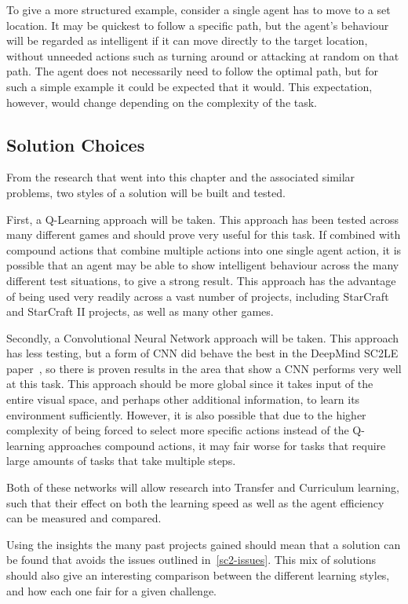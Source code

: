 To give a more structured example, consider a single agent has to move to
a set location. It may be quickest to follow a specific path, but the agent's
behaviour will be regarded as intelligent if it can move directly to the
target location, without unneeded actions such as turning around or attacking at
random on that path. The agent does not necessarily need to follow the optimal
path, but for such a simple example it could be expected that it would. This
expectation, however, would change depending on the complexity of the task.

\subsection{Solution Choices}

From the research that went into this chapter and the associated similar
problems, two styles of a solution will be built and tested.

First, a Q-Learning approach will be taken. This approach has been tested across
many different games and should prove very useful for this task. If combined
with compound actions that combine multiple actions into one single agent
action, it is possible that an agent may be able to show intelligent behaviour
across the many different test situations, to give a strong result. This
approach has the advantage of being used very readily across a vast number of
projects, including StarCraft and StarCraft II projects, as well as many other
games.

Secondly, a Convolutional Neural Network approach will be taken. This approach
has less testing, but a form of CNN did behave the best in the DeepMind SC2LE
paper~\cite{vinyals2017starcraft}, so there is proven results in the area that
show a CNN performs very well at this task. This approach should be more global
since it takes input of the entire visual space, and perhaps other additional
information, to learn its environment sufficiently.  However, it is also
possible that due to the higher complexity of being forced to select more
specific actions instead of the Q-learning approaches compound actions, it may
fair worse for tasks that require large amounts of tasks that take multiple
steps.

Both of these networks will allow research into Transfer and Curriculum
learning, such that their effect on both the learning speed as well as the agent
efficiency can be measured and compared.

Using the insights the many past projects gained should mean that a solution
can be found that avoids the issues outlined in~\ref{sc2-issues}. This mix of
solutions should also give an interesting comparison between the different
learning styles, and how each one fair for a given challenge.

